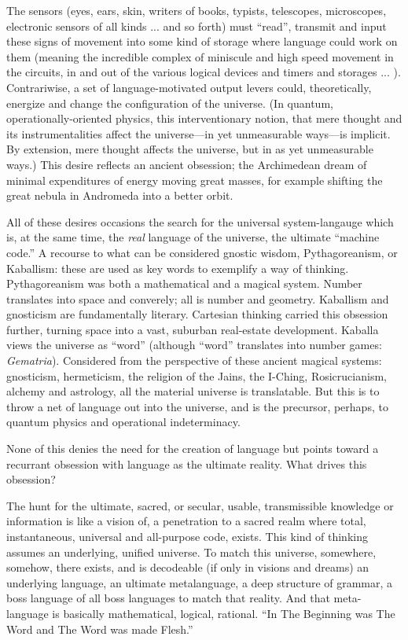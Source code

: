 \documentclass[11pt,twoside,draft]{memoir}
\begin{document}
The sensors (eyes, ears, skin, writers of books, typists, telescopes, microscopes, 
electronic sensors of all kinds ... and so forth)
must \enquote{read}, transmit and input these signs of movement into some kind of storage
where language could work on them (meaning the incredible complex of miniscule and
high speed movement in the circuits, in and out of the various logical devices and timers
and storages ... ). Contrariwise, a set of language-motivated output levers could,
theoretically, energize and change the configuration of the universe. (In quantum,
operationally-oriented physics, this interventionary notion, that mere thought and its
instrumentalities affect the universe---in yet unmeasurable ways---is implicit. 
By extension, mere thought affects the universe, but in as yet unmeasurable ways.) This desire
reflects an ancient obsession; the Archimedean dream of minimal expenditures of energy 
moving great masses, for example shifting the great nebula in Andromeda into a
better orbit.

All of these desires occasions the search for the universal system-langauge which is,
at the same time, the \emph{real} language of the universe, the ultimate \enquote{machine code.}
A recourse to what can be considered gnostic wisdom, Pythagoreanism, or Kaballism:
these are used as key words to exemplify a way of thinking. Pythagoreanism was both a
mathematical and a magical system. Number translates into space and converely; all is
number and geometry. Kaballism and gnosticism are fundamentally literary. Cartesian
thinking carried this obsession further, turning space into a vast, suburban real-estate
development. Kaballa views the universe as \enquote{word} (although \enquote{word} translates into
number games: \emph{Gematria}). Considered from the perspective of these ancient magical
systems: gnosticism, hermeticism, the religion of the Jains, the I-Ching, Rosicrucianism,
alchemy and astrology, all the material universe is translatable. But this is to throw a
net of language out into the universe, and is the precursor, perhaps, to quantum physics
and operational indeterminacy.

None of this denies the need for the creation of language but points toward a recurrant obsession with language as the ultimate reality. What drives this obsession?

The hunt for the ultimate, sacred, or secular, usable, transmissible knowledge or information is like a vision of, a penetration to a sacred realm where total, instantaneous,
universal and all-purpose code, exists. This kind of thinking assumes an underlying,
unified universe. To match this universe, somewhere, somehow,
there exists, and is decodeable (if only in visions and dreams)
an underlying language, an ultimate metalanguage, a deep structure of grammar, a
boss language of all boss languages to match that reality. 
And that meta-language is basically mathematical, logical, rational. 
\enquote{In The Beginning was The Word and The Word was made Flesh.}
\end{document}
